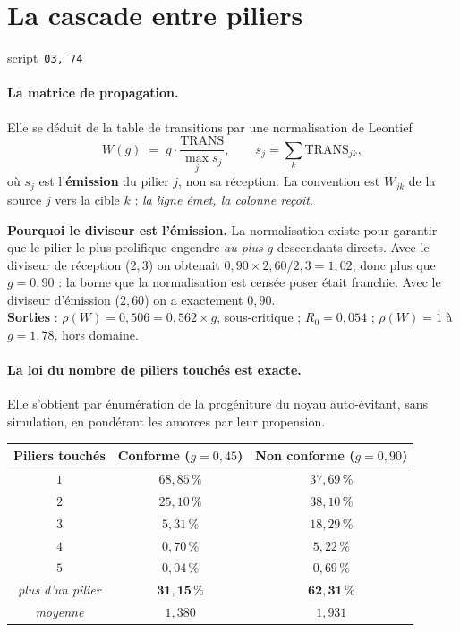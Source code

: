 \documentclass[11pt,a4paper]{article}
\newcommand{\src}[1]{\hfill{\footnotesize\textsf{script~\texttt{#1}}}}
\begin{document}
\section{La cascade entre piliers}
\src{\texttt{03}, \texttt{74}}

\paragraph{La matrice de propagation.} Elle se déduit de la table de transitions par une
normalisation de Leontief
\begin{equation}
W(g) \;=\; g \cdot \frac{\mathrm{TRANS}}{\max_j s_j},
\qquad s_j = \sum_k \mathrm{TRANS}_{jk},
\end{equation}
où $s_j$ est l'\textbf{émission} du pilier $j$, non sa réception. La convention est
$W_{jk}$ de la source $j$ vers la cible $k$ : \emph{la ligne émet, la colonne reçoit}.

\begin{res}
\textbf{Pourquoi le diviseur est l'émission.} La normalisation existe pour garantir que le
pilier le plus prolifique engendre \emph{au plus} $g$ descendants directs. Avec le diviseur de
réception ($2{,}3$) on obtenait $0{,}90 \times 2{,}60 / 2{,}3 = 1{,}02$, donc plus que
$g = 0{,}90$ : la borne que la normalisation est censée poser était franchie. Avec le diviseur
d'émission ($2{,}60$) on a exactement $0{,}90$.\\
\textbf{Sorties} : $\rho(W) = 0{,}506 = 0{,}562 \times g$, sous-critique ;
$R_0 = 0{,}054$ ; $\rho(W) = 1$ à $g = 1{,}78$, hors domaine.
\end{res}

\paragraph{La loi du nombre de piliers touchés est exacte.} Elle s'obtient par énumération de la
progéniture du noyau auto-évitant, sans simulation, en pondérant les amorces par leur propension.

\begin{center}\footnotesize
\renewcommand{\arraystretch}{1.15}
\begin{tabular}{@{}c c c@{}}
\toprule
\textbf{Piliers touchés} & \textbf{Conforme} ($g=0{,}45$) & \textbf{Non conforme} ($g=0{,}90$) \\
\midrule
$1$ & $68{,}85\,\%$ & $37{,}69\,\%$ \\
$2$ & $25{,}10\,\%$ & $38{,}10\,\%$ \\
$3$ & $5{,}31\,\%$ & $18{,}29\,\%$ \\
$4$ & $0{,}70\,\%$ & $5{,}22\,\%$ \\
$5$ & $0{,}04\,\%$ & $0{,}69\,\%$ \\
\midrule
\emph{plus d'un pilier} & $\mathbf{31{,}15\,\%}$ & $\mathbf{62{,}31\,\%}$ \\
\emph{moyenne} & $1{,}380$ & $1{,}931$ \\
\bottomrule
\end{tabular}
\end{center}
\end{document}
